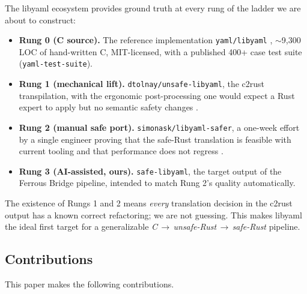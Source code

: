\documentclass[12pt]{article}
\theoremstyle{definition}
\theoremstyle{remark}
\begin{document}
The libyaml ecosystem provides ground truth at every rung of the ladder
we are about to construct:
\begin{itemize}
\item \textbf{Rung 0 (C source).} The reference implementation
  \texttt{yaml/libyaml} \cite{simonov2006libyaml}, $\sim$9{,}300 LOC of
  hand-written C, MIT-licensed, with a published 400+ case test suite
  (\texttt{yaml-test-suite}).
\item \textbf{Rung 1 (mechanical lift).}
  \texttt{dtolnay/unsafe-libyaml}, the c2rust transpilation, with the
  ergonomic post-processing one would expect a Rust expert to apply but
  no semantic safety changes \cite{tolnay2024unsafe}.
\item \textbf{Rung 2 (manual safe port).}
  \texttt{simonask/libyaml-safer}, a one-week effort by a single engineer
  proving that the safe-Rust translation is feasible with current
  tooling and that performance does not regress \cite{simonask2024}.
\item \textbf{Rung 3 (AI-assisted, ours).}
  \texttt{safe-libyaml}, the target output of the Ferrous Bridge
  pipeline, intended to match Rung 2's quality automatically.
\end{itemize}

The existence of Rungs 1 and 2 means \emph{every} translation decision in
the c2rust output has a known correct refactoring; we are not guessing.
This makes libyaml the ideal first target for a generalizable
\emph{C\,$\to$\,unsafe-Rust\,$\to$\,safe-Rust} pipeline.

\subsection{Contributions}

This paper makes the following contributions.
\end{document}
